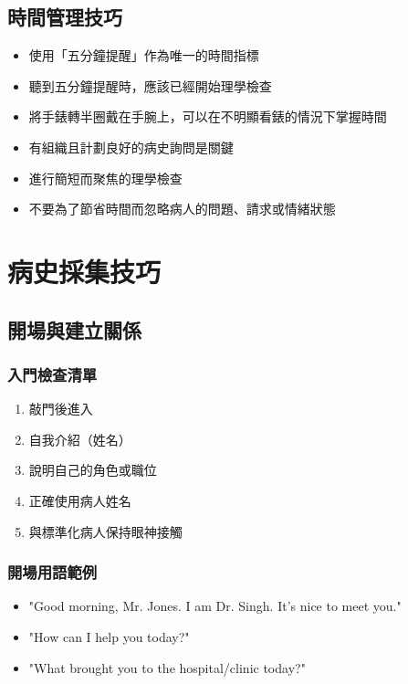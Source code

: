 \documentclass[12pt,a4paper]{article}
\begin{document}
\subsection{時間管理技巧}

\begin{itemize}
    \item 使用「五分鐘提醒」作為唯一的時間指標
    \item 聽到五分鐘提醒時，應該已經開始理學檢查
    \item 將手錶轉半圈戴在手腕上，可以在不明顯看錶的情況下掌握時間
    \item 有組織且計劃良好的病史詢問是關鍵
    \item 進行簡短而聚焦的理學檢查
    \item 不要為了節省時間而忽略病人的問題、請求或情緒狀態
\end{itemize}

\section{病史採集技巧}

\subsection{開場與建立關係}

\subsubsection{入門檢查清單}

\begin{tcolorbox}[colback=emergency_blue!10!white,colframe=emergency_blue,title=入場標準流程]
\begin{enumerate}
    \item 敲門後進入
    \item 自我介紹（姓名）
    \item 說明自己的角色或職位
    \item 正確使用病人姓名
    \item 與標準化病人保持眼神接觸
\end{enumerate}
\end{tcolorbox}

\subsubsection{開場用語範例}

\begin{itemize}
    \item "Good morning, Mr. Jones. I am Dr. Singh. It's nice to meet you."
    \item "How can I help you today?"
    \item "What brought you to the hospital/clinic today?"
\end{itemize}
\end{document}
